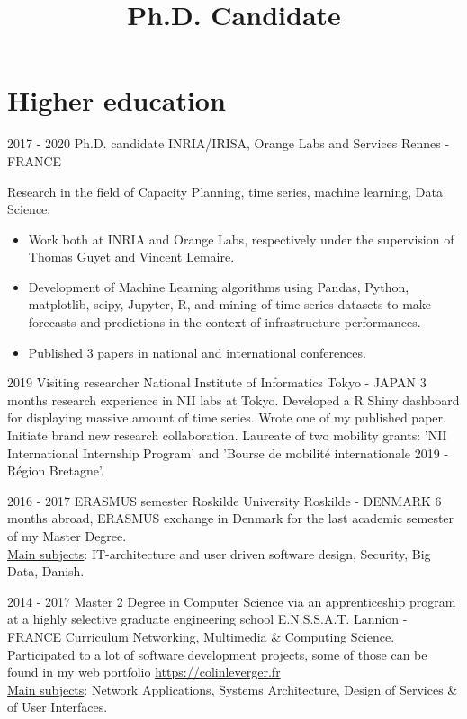 \documentclass[11pt,a4paper,sans]{moderncv}        %
\title{Ph.D. Candidate}                               %
\begin{document}
\makecvtitle

\section{Higher education}

\cventry
	{2017 - 2020}
	{Ph.D. candidate}
	{INRIA/IRISA, Orange Labs and Services}
	{Rennes - FRANCE}
	{}
	{
	Research in the field of Capacity Planning, time series, machine learning, Data Science. 
	\begin{itemize}
    \item Work both at INRIA and Orange Labs, respectively under the supervision of Thomas Guyet and Vincent Lemaire. 
    \item Development of Machine Learning algorithms using Pandas, Python, matplotlib, scipy, Jupyter, R, and mining of time series datasets to make forecasts and predictions in the context of infrastructure performances. 
    \item Published 3 papers in national and international conferences.
    \end{itemize}		
}

\cventry
	{2019}
	{Visiting researcher}
	{National Institute of Informatics}
	{Tokyo - JAPAN}
	{}
	{3 months research experience in NII labs at Tokyo.  
    Developed a R Shiny dashboard for displaying massive amount of time series.
    Wrote one of my published paper.
    Initiate brand new research collaboration. 
    Laureate of two mobility grants: 'NII International Internship Program' and 'Bourse de mobilit\'e internationale 2019 - R\'egion Bretagne'.
    }

\cventry
	{2016 - 2017}
	{ERASMUS semester}
	{Roskilde University}
	{Roskilde - DENMARK}
	{}
	{6 months abroad, ERASMUS exchange in Denmark for the last academic semester of my Master Degree.\\ 
	\underline{Main subjects}: IT-architecture and user driven software design, Security, Big Data, Danish.}  %


\cventry
	{2014 - 2017}
	{Master 2 Degree in Computer Science via an apprenticeship program at a highly selective graduate engineering school}
	{E.N.S.S.A.T.}
	{Lannion - FRANCE}
	{}
	{Curriculum Networking, Multimedia \& Computing Science.\\
	Participated to a lot of software development projects, some of those can be found in my web portfolio \href{https://colinleverger.fr}{https://colinleverger.fr}\\
    \underline{Main subjects}: Network Applications, Systems Architecture, Design of Services \& of User Interfaces.}  %
\end{document}

